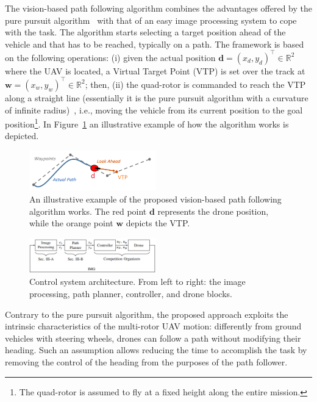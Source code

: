\documentclass[a4paper,twocolumn,10pt]{article}
\begin{document}
    The vision-based path following algorithm combines the advantages offered by the pure pursuit algorithm~\cite{bibItem22} with that of an easy image processing system to cope with the task. The algorithm starts selecting a target position ahead of the vehicle and that has to be reached, typically on a path. The framework is based on the following operations: (i) given 
    the actual position $\mathbf{d}=(x_d, y_d)^\top \in \mathbb{R}^2$ where the UAV is located, 
    a Virtual Target Point (VTP)  is set over the track at $\mathbf{w}=(x_w, y_w)^\top \in \mathbb{R}^2$; then, (ii) the quad-rotor is commanded to reach the VTP along a straight line (essentially it is the pure 
    pursuit algorithm with a curvature of infinite radius)~\cite{bibItem22}, i.e., 
    moving the vehicle from its current position to the goal position\footnote{The quad-rotor is assumed to fly at a fixed height along the entire mission.}. 
    In Figure~\ref{fig:fig3path} an illustrative example of how the algorithm works is depicted. 

    \begin{figure}
        \centering
        \includegraphics[width=0.49\textwidth]{pics/fig3_path.png}
        \caption{An illustrative example of the proposed vision-based path following algorithm works. 
        The red point $\mathbf{d}$ represents the drone position, while the orange point $\mathbf{w}$ 
        depicts the VTP.}
        \label{fig:fig3path}
    \end{figure}
    \begin{figure}
        \centering
        \includegraphics[width=0.49\textwidth]{pics/fig4_frick.png}
        \caption{Control system architecture. From left to right: the image processing, path planner, 
        controller, and drone blocks.}
        \label{fig:fig4diagram}
    \end{figure}

    Contrary to the pure pursuit algorithm, the proposed approach exploits the intrinsic 
    characteristics of the multi-rotor UAV motion: differently from ground vehicles with steering 
    wheels, drones can follow a path without modifying their heading. Such an assumption allows 
    reducing the time to accomplish the task by removing the control of the heading from the purposes 
    of the path follower.
\end{document}
